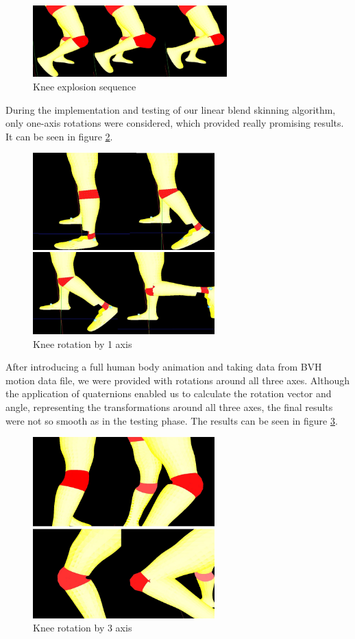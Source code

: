 \documentclass[times, 10pt,twocolumn]{article}
\begin{document}
\begin{figure}[H]
  \caption{Knee explosion sequence}
  \label{knee_explosion}
  \centering
  \includegraphics[width=75mm]{images/s_knee_explosion.jpg}
\end{figure}


During the implementation and testing of our linear blend skinning algorithm, only one-axis rotations were considered, which provided really promising results. It can be seen in figure \ref{knee_1axis}.

\begin{figure}[H]
  \caption{Knee rotation by 1 axis}
  \label{knee_1axis}
  \centering
  \includegraphics[width=70mm]{images/s_knee_rot1.jpg}
\end{figure}

After introducing a full human body animation and taking data from BVH motion data file, we were provided with rotations around all three axes. Although the application of quaternions enabled us to calculate the rotation vector and angle, representing the transformations around all three axes, the final results were not so smooth as in the testing phase. The results can be seen in figure \ref{knee_3axis}.

\begin{figure}[H]
  \caption{Knee rotation by 3 axis}
  \label{knee_3axis}
  \centering
  \includegraphics[width=70mm]{images/s_knee.jpg}
\end{figure}
\end{document}
